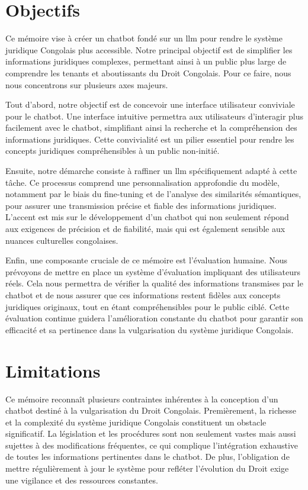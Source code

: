 \section{Objectifs}
Ce mémoire vise à créer un chatbot fondé sur un \ac{llm} pour rendre le système juridique Congolais plus accessible. Notre principal objectif est de simplifier les informations juridiques complexes, permettant ainsi à un public plus large de comprendre les tenants et aboutissants du Droit Congolais. Pour ce faire, nous nous concentrons sur plusieurs axes majeurs.

Tout d'abord, notre objectif est de concevoir une interface utilisateur conviviale pour le chatbot. Une interface intuitive permettra aux utilisateurs d'interagir plus facilement avec le chatbot, simplifiant ainsi la recherche et la compréhension des informations juridiques. Cette convivialité est un pilier essentiel pour rendre les concepts juridiques compréhensibles à un public non-initié.

Ensuite, notre démarche consiste à raffiner un \ac{llm} spécifiquement adapté à cette tâche. Ce processus comprend une personnalisation approfondie du modèle, notamment par le biais du fine-tuning et de l'analyse des similarités sémantiques, pour assurer une transmission précise et fiable des informations juridiques. L'accent est mis sur le développement d'un chatbot qui non seulement répond aux exigences de précision et de fiabilité, mais qui est également sensible aux nuances culturelles congolaises.

Enfin, une composante cruciale de ce mémoire est l'évaluation humaine. Nous prévoyons de mettre en place un système d'évaluation impliquant des utilisateurs réels. Cela nous permettra de vérifier la qualité des informations transmises par le chatbot et de nous assurer que ces informations restent fidèles aux concepts juridiques originaux, tout en étant compréhensibles pour le public ciblé. Cette évaluation continue guidera l'amélioration constante du chatbot pour garantir son efficacité et sa pertinence dans la vulgarisation du système juridique Congolais.


\section{Limitations}
\label{ch:0:section:limitaions}

Ce mémoire reconnaît plusieurs contraintes inhérentes à la conception d'un chatbot destiné à la vulgarisation du Droit Congolais. Premièrement, la richesse et la complexité du système juridique Congolais constituent un obstacle significatif. La législation et les procédures sont non seulement vastes mais aussi sujettes à des modifications fréquentes, ce qui complique l'intégration exhaustive de toutes les informations pertinentes dans le chatbot. De plus, l'obligation de mettre régulièrement à jour le système pour refléter l'évolution du Droit exige une vigilance et des ressources constantes.

